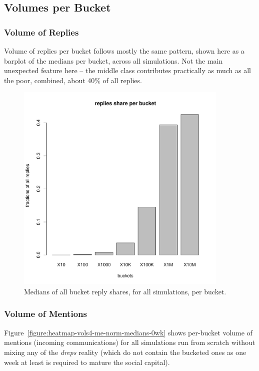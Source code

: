 \documentclass[10pt,oneside]{memoir}
\begin{document}
\begin{Spacing}{2}
\pagebreak \subsection{Volumes per Bucket}
\label{volumesperbucket}

\subsubsection{Volume of Replies}
\label{volumeofreplies}

Volume of replies per bucket follows mostly the same pattern, shown here as a barplot of the medians per bucket, across all simulations.   Not the main unexpected feature here -- the middle class contributes practically as much as all the poor, combined, about 40\% of all replies.



\begin{figure}
\begin{center}
    \includegraphics[width=4in]{figures/vols4-re-norm-medians-med}
    \caption{Medians of all bucket reply shares, for all simulations, per bucket.}
    \label{figure:vols4-re-norm-medians-med}
\end{center}
\end{figure}
\pagebreak \subsubsection{Volume of Mentions}
\label{volumeofmentions}

Figure~\ref{figure:heatmap-vols4-me-norm-medians-0wk} shows per-bucket volume of mentions (incoming communications) for all simulations  run from scratch without mixing any of the {\itshape dreps} reality (which do not contain the bucketed ones as one week at least is required to mature the social capital).



\end{Spacing}
\end{document}
